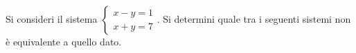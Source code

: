 Si consideri il sistema $\left\{\begin{matrix}x-y=1\\x+y=7\end{matrix}\right.$. 
Si determini quale tra i seguenti sistemi non è
equivalente a quello dato. 
